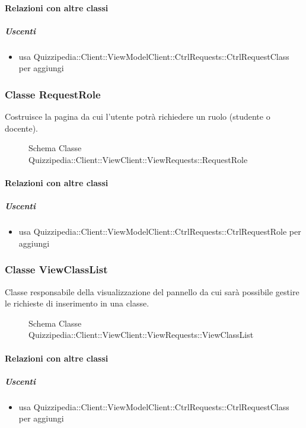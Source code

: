 \paragraph{Relazioni con altre classi}
\subparagraph{Uscenti}
\begin{itemize}
\item usa Quizzipedia::Client::ViewModelClient::CtrlRequests::CtrlRequestClass per aggiungi
\end{itemize}
\subsubsection{Classe RequestRole}
Costruisce la pagina da cui l'utente potrà richiedere un ruolo (studente o docente).
\begin{figure}[H]
\centering
\noindent{}
\caption[Schema Classe RequestRole]{Schema Classe Quizzipedia::Client::ViewClient::ViewRequests::RequestRole}
\end{figure}
\paragraph{Relazioni con altre classi}
\subparagraph{Uscenti}
\begin{itemize}
\item usa Quizzipedia::Client::ViewModelClient::CtrlRequests::CtrlRequestRole per aggiungi
\end{itemize}
\subsubsection{Classe ViewClassList}
Classe responsabile della visualizzazione del pannello da cui sarà possibile gestire le richieste di inserimento in una classe.
\begin{figure}[H]
\centering
\noindent{}
\caption[Schema Classe ViewClassList]{Schema Classe Quizzipedia::Client::ViewClient::ViewRequests::ViewClassList}
\end{figure}
\paragraph{Relazioni con altre classi}
\subparagraph{Uscenti}
\begin{itemize}
\item usa Quizzipedia::Client::ViewModelClient::CtrlRequests::CtrlRequestClass per aggiungi
\end{itemize}
